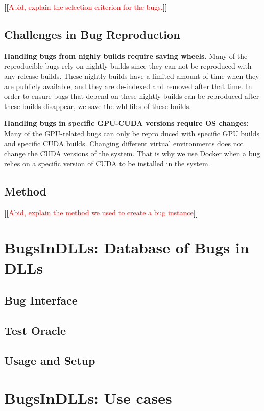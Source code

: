 \documentclass[sigconf]{acmart}
\newcommand{\Fix}[1]{\textbf{[[}\textcolor{red}{#1}\textbf{]]}}
\newcommand{\tname}{BugsInDLLs}
\begin{document}
\Fix{Abid, explain the selection criterion for the bugs.}

\subsection{Challenges in Bug Reproduction}

\textbf{Handling bugs from nighly builds require saving wheels.}  Many
of the reproducible bugs rely on nightly builds since they can not be
reproduced with any release builds. These nightly builds have a
limited amount of time when they are publicly available, and they are
de-indexed and removed after that time. In order to ensure bugs that
depend on these nightly builds can be reproduced after these builds
disappear, we save the whl files of these builds.

\textbf{Handling bugs in specific GPU-CUDA versions require OS
  changes:} Many of the GPU-related bugs can only be repro duced with
specific GPU builds and specific CUDA builds. Changing different
virtual environments does not change the CUDA versions of the
system. That is why we use Docker when a bug relies on a specific
version of CUDA to be installed in the system.

\subsection{Method}

\Fix{Abid, explain the method we used to create a bug instance}


\section{\tname: Database of Bugs in DLLs}
\subsection{Bug Interface}
\subsection{Test Oracle}
\subsection{Usage and Setup}

\section{\tname: Use cases}
\end{document}
